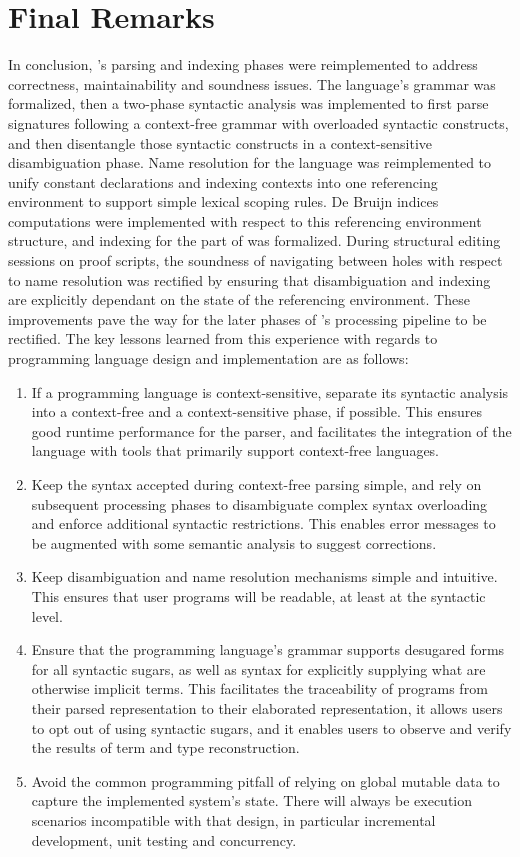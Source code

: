 \section{Final Remarks}

In conclusion, \Beluga's parsing and indexing phases were reimplemented to address correctness, maintainability and soundness issues.
The language's grammar was formalized, then a two-phase syntactic analysis was implemented to first parse \Beluga signatures following a context-free grammar with overloaded syntactic constructs, and then disentangle those syntactic constructs in a context-sensitive disambiguation phase.
Name resolution for the language was reimplemented to unify constant declarations and indexing contexts into one referencing environment to support simple lexical scoping rules.
De Bruijn indices computations were implemented with respect to this referencing environment structure, and indexing for the \LF part of \Beluga was formalized.
During \Harpoon structural editing sessions on proof scripts, the soundness of navigating between holes with respect to name resolution was rectified by ensuring that disambiguation and indexing are explicitly dependant on the state of the referencing environment.
These improvements pave the way for the later phases of \Beluga's processing pipeline to be rectified.
The key lessons learned from this experience with regards to programming language design and implementation are as follows:

\begin{enumerate}
\item
If a programming language is context-sensitive, separate its syntactic analysis into a context-free and a context-sensitive phase, if possible.
This ensures good runtime performance for the parser, and facilitates the integration of the language with tools that primarily support context-free languages.
\item
Keep the syntax accepted during context-free parsing simple, and rely on subsequent processing phases to disambiguate complex syntax overloading and enforce additional syntactic restrictions.
This enables error messages to be augmented with some semantic analysis to suggest corrections.
\item
Keep disambiguation and name resolution mechanisms simple and intuitive.
This ensures that user programs will be readable, at least at the syntactic level.
\item
Ensure that the programming language's grammar supports desugared forms for all syntactic sugars, as well as syntax for explicitly supplying what are otherwise implicit terms.
This facilitates the traceability of programs from their parsed representation to their elaborated representation, it allows users to opt out of using syntactic sugars, and it enables users to observe and verify the results of term and type reconstruction.
\item
Avoid the common programming pitfall of relying on global mutable data to capture the implemented system's state.
There will always be execution scenarios incompatible with that design, in particular incremental development, unit testing and concurrency.
\end{enumerate}
